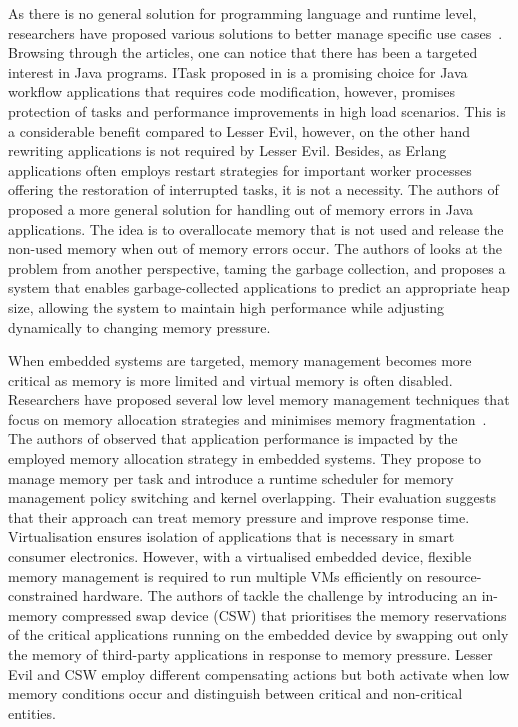 \documentclass{llncs}
\begin{document}
As there is no general solution for programming language and runtime level, researchers have proposed various solutions to better manage specific use cases~\cite{app5,app7,app6,itasks}. Browsing through the articles, one can notice that there has been a targeted interest in Java programs. ITask proposed in \cite{itasks} is a promising choice for Java workflow applications that requires code modification, however, promises protection of tasks and performance improvements in high load scenarios. This is a considerable benefit compared to Lesser Evil, however, on the other hand rewriting applications is not required by Lesser Evil. Besides, as Erlang applications often employs restart strategies for important worker processes offering the restoration of interrupted tasks, it is not a necessity. The authors of \cite{hedgetechnique} proposed a more general solution for handling out of memory errors in Java applications. The idea is to overallocate memory that is not used and release the non-used memory when out of memory errors occur. The authors of \cite{yang2006cramm} looks at the problem from another perspective, taming the garbage collection, and proposes a system that enables garbage-collected applications to predict an appropriate heap size, allowing the system to maintain high performance while adjusting dynamically to changing memory pressure.

When embedded systems are targeted, memory management becomes more  critical as memory is more limited and virtual memory is often disabled. Researchers have proposed several low level memory management techniques that focus on memory allocation strategies and minimises memory fragmentation~\cite{embedded-low1,embedded-low3}. The authors of \cite{embedded3} observed that application performance is impacted by the employed memory allocation strategy in embedded systems. They propose to manage memory per task and introduce a runtime scheduler for memory management policy switching and kernel overlapping. Their evaluation suggests that their approach can treat memory pressure and improve response time. Virtualisation ensures isolation of applications that is necessary in smart consumer electronics. However, with a  virtualised embedded device, flexible memory management is required to run multiple VMs efficiently on resource-constrained hardware. The authors of \cite{embedded4} tackle the challenge by introducing an in-memory compressed swap device (CSW) that prioritises the memory reservations of the critical applications running on the embedded device by swapping out only the memory of third-party applications in response to memory pressure. Lesser Evil and CSW employ different compensating actions but both activate when low memory conditions occur and distinguish between critical and non-critical entities.
\end{document}
